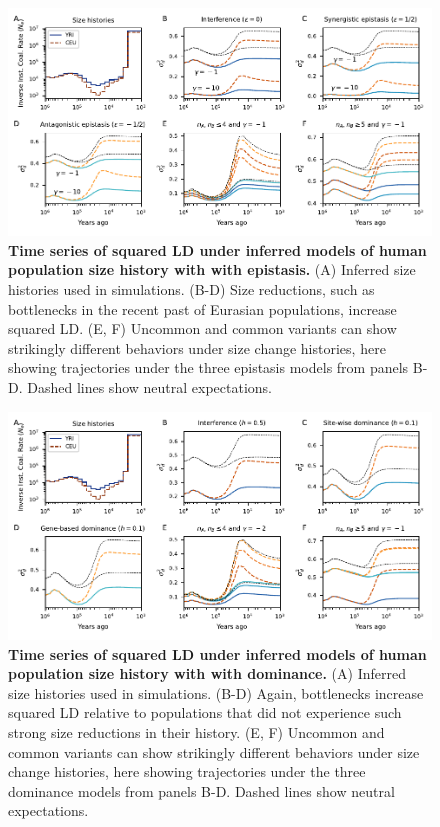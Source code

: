 \documentclass[]{article}
\begin{document}
\begin{figure}[ht!]
    \centering
    \includegraphics{../figures/demog_YRI_CEU.sd2}
    \caption{
        \textbf{Time series of squared LD under inferred models of human population
        size history with with epistasis.}
        (A) Inferred size histories used in simulations.
        (B-D)
        Size reductions, such as bottlenecks in the recent past of Eurasian populations,
        increase squared LD.
        (E, F) Uncommon and common variants can show strikingly different behaviors
        under size change histories, here showing trajectories under the three
        epistasis models from panels B-D.
        Dashed lines show neutral expectations.
    }
    \label{fig:relate_sd2}
\end{figure}

\begin{figure}[ht!]
    \centering
    \includegraphics{../figures/demog_YRI_CEU.dominance.sd2}
    \caption{
        \textbf{Time series of squared LD under inferred models of human population
        size history with with dominance.}
        (A) Inferred size histories used in simulations.
        (B-D)
        Again, bottlenecks increase squared LD relative to populations that did
        not experience such strong size reductions in their history.
        (E, F) Uncommon and common variants can show strikingly different behaviors
        under size change histories, here showing trajectories under the three
        dominance models from panels B-D.
        Dashed lines show neutral expectations.
    }
    \label{fig:relate_dom_sd2}
\end{figure}
\end{document}
